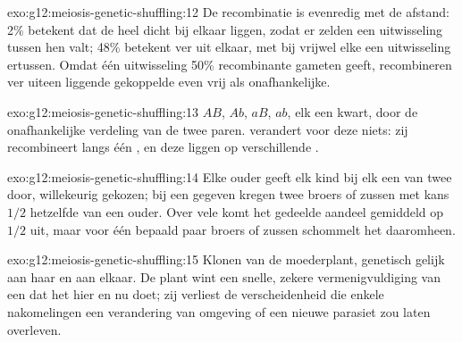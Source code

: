 \begin{solution}{exo:g12:meiosis-genetic-shuffling:12}
De recombinatie is evenredig met de afstand: 2\% betekent dat de 
heel dicht bij elkaar liggen, zodat er zelden een uitwisseling tussen hen
valt; 48\% betekent ver uit elkaar, met bij vrijwel elke  een
uitwisseling ertussen. Omdat één uitwisseling 50\% recombinante gameten
geeft, recombineren ver uiteen liggende gekoppelde  even vrij als
onafhankelijke.
\end{solution}

\begin{solution}{exo:g12:meiosis-genetic-shuffling:13}
$AB$, $Ab$, $aB$, $ab$, elk een kwart, door de onafhankelijke verdeling
van de twee paren.  verandert voor deze  niets: zij
recombineert  langs één , en deze liggen op
verschillende .
\end{solution}

\begin{solution}{exo:g12:meiosis-genetic-shuffling:14}
Elke ouder geeft elk kind bij elk  een van twee  door,
willekeurig gekozen; bij een gegeven  kregen twee broers of zussen met
kans $1/2$ hetzelfde  van een ouder. Over vele  komt het
gedeelde aandeel gemiddeld op $1/2$ uit, maar voor één bepaald paar
broers of zussen schommelt het daaromheen.
\end{solution}

\begin{solution}{exo:g12:meiosis-genetic-shuffling:15}
Klonen van de moederplant, genetisch gelijk aan haar en aan elkaar. De
plant wint een snelle, zekere vermenigvuldiging van een  dat het
hier en nu doet; zij verliest de verscheidenheid die enkele nakomelingen
een verandering van omgeving of een nieuwe parasiet zou laten overleven.
\end{solution}

